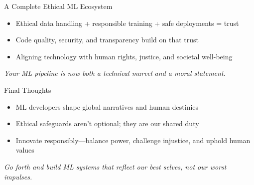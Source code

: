 \documentclass[aspectratio=169]{beamer}
\begin{document}
%
\begin{frame}{A Complete Ethical ML Ecosystem}
\begin{itemize}
\item Ethical data handling + responsible training + safe deployments = trust
\item Code quality, security, and transparency build on that trust
\item Aligning technology with human rights, justice, and societal well-being
\end{itemize}

\vspace{0.8em}
\emph{Your ML pipeline is now both a technical marvel and a moral statement.}
\end{frame}

%
%
\begin{frame}{Final Thoughts}
\begin{itemize}
\item ML developers shape global narratives and human destinies
\item Ethical safeguards aren’t optional; they are our shared duty
\item Innovate responsibly—balance power, challenge injustice, and uphold human values
\end{itemize}

\vspace{0.8em}
\emph{Go forth and build ML systems that reflect our best selves, not our worst impulses.}
\end{frame}
\end{document}
